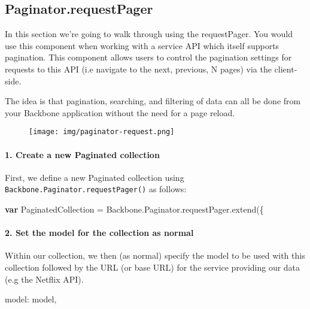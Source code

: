 \documentclass[9pt]{book}
\newenvironment{Shaded}{}{}
\newcommand{\KeywordTok}[1]{\textcolor[rgb]{0.00,0.44,0.13}{\textbf{{#1}}}}
\newcommand{\OtherTok}[1]{\textcolor[rgb]{0.00,0.44,0.13}{{#1}}}
\newcommand{\FunctionTok}[1]{\textcolor[rgb]{0.02,0.16,0.49}{{#1}}}
\newcommand{\NormalTok}[1]{{#1}}
\begin{document}
\subsection{Paginator.requestPager}\label{paginator.requestpager}

In this section we're going to walk through using the requestPager. You
would use this component when working with a service API which itself
supports pagination. This component allows users to control the
pagination settings for requests to this API (i.e navigate to the next,
previous, N pages) via the client-side.

The idea is that pagination, searching, and filtering of data can all be
done from your Backbone application without the need for a page reload.

\begin{figure}[htbp]
\centering
\texttt{[image: img/paginator-request.png]}
\end{figure}

\paragraph{1. Create a new Paginated
collection}\label{create-a-new-paginated-collection}

First, we define a new Paginated collection using
\texttt{Backbone.Paginator.requestPager()} as follows:

\begin{Shaded}
\begin{Highlighting}[]

\KeywordTok{var} \NormalTok{PaginatedCollection = }\OtherTok{Backbone}\NormalTok{.}\OtherTok{Paginator}\NormalTok{.}\OtherTok{requestPager}\NormalTok{.}\FunctionTok{extend}\NormalTok{(\{}
\end{Highlighting}
\end{Shaded}

\paragraph{2. Set the model for the collection as
normal}\label{set-the-model-for-the-collection-as-normal}

Within our collection, we then (as normal) specify the model to be used
with this collection followed by the URL (or base URL) for the service
providing our data (e.g the Netflix API).

\begin{Shaded}
\begin{Highlighting}[]

        \NormalTok{model: model,}
\end{Highlighting}
\end{Shaded}
\end{document}
